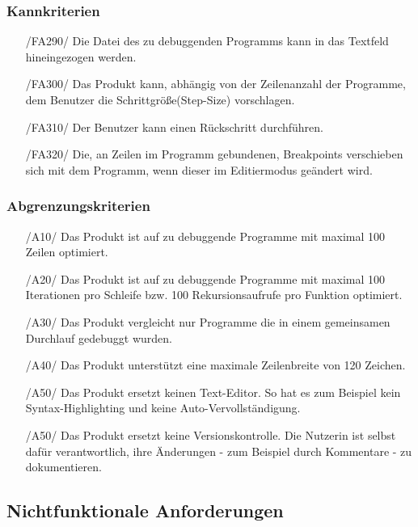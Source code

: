 \documentclass[parskip=full]{scrartcl}
\begin{document}
 		\subsubsection{Kannkriterien}
		\begin{itemize}
		\item[/FA290/] Die Datei des zu debuggenden Programms kann in das Textfeld hineingezogen werden.
		\item[/FA300/] Das Produkt kann, abhängig von der Zeilenanzahl der Programme, dem Benutzer die Schrittgröße(Step-Size) vorschlagen.
		\item[/FA310/] Der Benutzer kann einen Rückschritt durchführen.
		\item[/FA320/] Die, an Zeilen im Programm gebundenen, \glspl{Breakpoint} verschieben sich mit dem Programm, wenn dieser im \gls{Editiermodus} geändert wird.
		\end{itemize}		 		
 		
 		
 		\subsubsection{Abgrenzungskriterien}
 		\begin{itemize}
 		\item[/A10/] Das Produkt ist auf zu debuggende Programme mit maximal 100 Zeilen optimiert.
 		\item[/A20/] Das Produkt ist auf zu debuggende Programme mit maximal 100 Iterationen pro Schleife bzw. 100 Rekursionsaufrufe pro Funktion optimiert.
 		\item[/A30/] Das Produkt vergleicht nur Programme die in einem gemeinsamen Durchlauf gedebuggt wurden.
 		\item[/A40/] Das Produkt unterstützt eine maximale Zeilenbreite von 120 Zeichen.
 		\item[/A50/] Das Produkt ersetzt keinen Text-Editor. So hat es zum Beispiel kein Syntax-Highlighting und keine Auto-Vervollständigung.
 		\item[/A50/] Das Produkt ersetzt keine Versionskontrolle. Die Nutzerin ist selbst dafür verantwortlich, ihre Änderungen - zum Beispiel durch Kommentare - zu dokumentieren.
 		\end{itemize}
 		
 \newpage		
 		
	\subsection{Nichtfunktionale Anforderungen}
\end{document}

